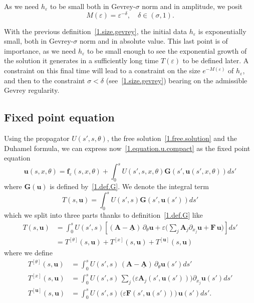 \documentclass[AHL,Unicode,longabstracts,published]{cedram}
\theoremstyle{plain}
\newcommand*\e{\varepsilon}
\newcommand{\dptl}{\partial}%
\newcommand{\ubf}{{\mathbf u}}
\newcommand*\f{{\mathbf f}}
\newcommand*\A{{\mathbf A}}
\newcommand*\F{{\mathbf F}}
\newcommand*\und{\underline}
\begin{document}
As we need $h_{\e}$ to be small both in Gevrey-$\sigma$ norm and in amplitude, we posit
\begin{equation}\label{1.size.gevrey}
M(\e) = \e^{-\delta}, \quad \delta \in(\sigma,1).
\end{equation}

\begin{rema}\label{1.remark.size.gevrey}
With the previous definition~\eqref{1.size.gevrey}, the initial data $h_{\e}$ is exponentially small, both in Gevrey-$\sigma$ norm and in absolute value. This last point is of importance, as we need $h_{\e}$ to be small enough to see the exponential growth of the solution it generates in a sufficiently long time $T(\e)$ to be defined later. A constraint on this final time will lead to a constraint on the size $e^{-M(\e)}$ of $h_{\e}$, and then to the constraint $\sigma < \delta$ (see~\eqref{1.size.gevrey}) bearing on the admissible Gevrey regularity.
\end{rema}



\subsection{Fixed point equation}

Using the propagator $U(s',s,\theta)$, the free solution~\eqref{1.free.solution} and the Duhamel formula, we can express now~\eqref{1.equation.u.compact} as the fixed point equation
\begin{equation}\label{1.fixed.point.equation}
\ubf(s,x,\theta) = \f_{\e}(s,x,\theta) + \int_{0}^{s} U(s',s,x,\theta) {\mathbf G}(s',\ubf(s',x,\theta)) ds'
\end{equation}
where ${\mathbf G}(\ubf)$ is defined by~\eqref{1.def.G}. We denote the integral term
\begin{equation}\label{1.defi.T}
T(s,\ubf) = \int_{0}^{s} U(s',s) {\mathbf G}(s',\ubf(s')) ds'
\end{equation}
which we split into three parts thanks to definition~\eqref{1.def.G} like
\begin{equation}\label{1.defi.T.decoupage}
\begin{aligned}
T(s,\ubf) & = \int_{0}^{s} U(s',s) \left[\left({\mathbf A} - \und{{\mathbf A}} \right)\,\dptl_{\theta} \ubf + \e\bigg(\sum_j {\mathbf A}_j \dptl_{x_j} \ubf + {\mathbf F} \, \ubf\bigg) \right] ds' \\
& = T^{[\theta]}(s,\ubf) + T^{[x]}(s,\ubf) + T^{[\ubf]}(s,\ubf)
\end{aligned}
\end{equation}
where we define
\begin{align}
T^{[\theta]}(s,\ubf) & = \int_{0}^{s} U(s',s) \,\left({\mathbf A} - \und{{\mathbf A}} \right) \,\dptl_{\theta} \ubf(s') ds' \label{1.def.T_theta}
\\
T^{[x]}(s,\ubf) & = \int_{0}^{s} U(s',s)\, \sum_j\big(\e\A_j(s',\ubf(s'))\big) \dptl_{x_j} \ubf(s') ds' \label{1.def.T_x}
\\
T^{[\ubf]}(s,\ubf) & = \int_{0}^{s} U(s',s) \, \big(\e \F(s',\ubf(s'))\big) \, \ubf(s') ds' \label{1.def.T_u}
.
\end{align}
\end{document}
